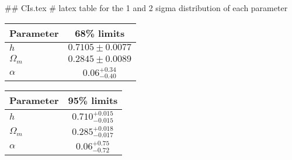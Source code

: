 ## CIs.tex
# latex table for the 1 and 2 sigma distribution of each parameter

\begin{tabular} { l  c}
 Parameter &  68\% limits\\
\hline
{\boldmath$h              $} & $0.7105\pm 0.0077          $\\
{\boldmath$\Omega_m       $} & $0.2845\pm 0.0089          $\\
{\boldmath$\alpha         $} & $0.06^{+0.34}_{-0.40}      $\\
\hline
\end{tabular}

\begin{tabular} { l  c}
 Parameter &  95\% limits\\
\hline
{\boldmath$h              $} & $0.710^{+0.015}_{-0.015}   $\\
{\boldmath$\Omega_m       $} & $0.285^{+0.018}_{-0.017}   $\\
{\boldmath$\alpha         $} & $0.06^{+0.75}_{-0.72}      $\\
\hline
\end{tabular}

